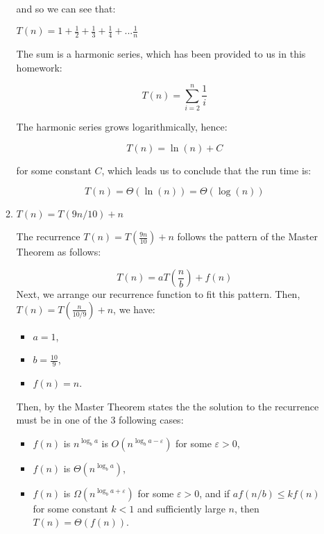 \documentclass[11pt]{article}
\begin{document}
\begin{enumerate}
\begin{enumerate}
and so we can see that:

$T(n) = 1 + \frac{1}{2} + \frac{1}{3} + \frac{1}{4} + ... \frac{1}{n}$

The sum is a harmonic series, which has been provided to us in this homework:

\[
T(n) = \sum_{i=2}^{n} \frac{1}{i}
\]

The harmonic series grows logarithmically, hence:

\[
T(n) = \ln(n) + C
\]

for some constant \( C \), which leads us to conclude that the run time is:

\[
T(n) = \Theta(\ln(n)) = \Theta(\log(n))
\]

\item $T(n) = T(9n/10) + n$

The recurrence \( T(n) = T\left(\frac{9n}{10}\right) + n \) follows the pattern of the Master Theorem as follows:

\[ T(n) = aT\left(\frac{n}{b}\right) + f(n) \]
Next, we arrange our recurrence function to fit this pattern.
Then, \( T(n) = T\left(\frac{n}{10/9}\right) + n \), we have:
\begin{itemize}
    \item \( a = 1 \),
    \item \( b = \frac{10}{9} \),
    \item \( f(n) = n \).
\end{itemize}

Then, by the Master Theorem states the the solution to the recurrence must be in one of the 3 following cases:
\begin{itemize}
    \item \( f(n) \) is \( n^{\log_b a} \) is \( O(n^{\log_b a - \varepsilon}) \) for some \( \varepsilon > 0 \),
    \item \( f(n) \) is \( \Theta(n^{\log_b a}) \),
    \item \( f(n) \) is \( \Omega(n^{\log_b a + \varepsilon}) \) for some \( \varepsilon > 0 \), and if \( a f(n/b) \leq k f(n) \) for some constant \( k < 1 \) and sufficiently large \( n \), then \( T(n) = \Theta(f(n)) \).
\end{itemize}


\end{enumerate}
\end{enumerate}
\end{document}
